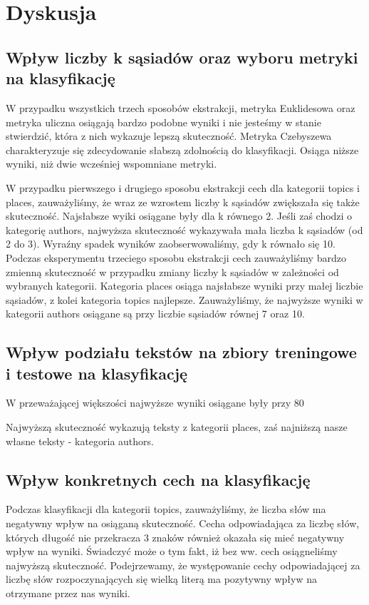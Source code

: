 \documentclass{classrep}
\begin{document}
\section{Dyskusja}

\subsection{Wpływ liczby k sąsiadów oraz wyboru metryki na klasyfikację}
W przypadku wszystkich trzech sposobów ekstrakcji, metryka Euklidesowa oraz metryka uliczna osiągają bardzo podobne wyniki i nie jesteśmy w stanie stwierdzić, która z nich wykazuje lepszą skuteczność. Metryka Czebyszewa charakteryzuje się zdecydowanie słabszą zdolnością do klasyfikacji. Osiąga niższe wyniki, niż dwie wcześniej wspomniane metryki.
 \newline

W przypadku pierwszego i drugiego sposobu ekstrakcji cech dla kategorii topics i places, zauważyliśmy, że wraz ze wzrostem liczby k sąsiadów zwiększała się także skuteczność. Najsłabsze wyiki osiągane były dla k równego 2. Jeśli zaś chodzi o kategorię authors, najwyższa skuteczność wykazywała mała liczba k sąsiadów (od 2 do 3). Wyraźny spadek wyników zaobserwowaliśmy, gdy k równało się 10. Podczas eksperymentu trzeciego sposobu ekstrakcji cech zauważyliśmy bardzo zmienną skuteczność w przypadku zmiany liczby k sąsiadów w zależności od wybranych kategorii. Kategoria places osiąga najsłabsze wyniki przy małej liczbie sąsiadów, z kolei kategoria topics najlepsze. Zauważyliśmy, że najwyższe wyniki w kategorii authors osiągane są przy liczbie sąsiadów równej 7 oraz 10. 


\subsection{Wpływ podziału tekstów na zbiory treningowe i testowe na klasyfikację}
W przeważającej większości najwyższe wyniki osiągane były przy 80%
\newline

Najwyższą skuteczność wykazują teksty z kategorii places, zaś najniższą nasze własne teksty - kategoria authors.  

\subsection{Wpływ konkretnych cech na klasyfikację}
Podczas klasyfikacji dla kategorii topics, zauważyliśmy, że liczba słów ma negatywny wpływ na osiąganą skuteczność. Cecha odpowiadająca za liczbę słów, których długość nie przekracza 3 znaków również okazała się mieć negatywny wpływ na wyniki. Świadczyć może o tym fakt, iż bez ww. cech osiągneliśmy najwyższą skuteczność. Podejrzewamy, że występowanie cechy odpowiadającej za liczbę słów rozpoczynających się wielką literą ma pozytywny wpływ na otrzymane przez nas wyniki. \newline
\end{document}
